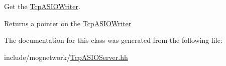 Get the \hyperlink{classmognetwork_1_1_tcp_a_s_i_o_writer}{Tcp\-A\-S\-I\-O\-Writer}. 

\begin{DoxyReturn}{Returns}
a pointer on the \hyperlink{classmognetwork_1_1_tcp_a_s_i_o_writer}{Tcp\-A\-S\-I\-O\-Writer} 
\end{DoxyReturn}


The documentation for this class was generated from the following file\-:\begin{DoxyCompactItemize}
\item 
include/mognetwork/\hyperlink{_tcp_a_s_i_o_server_8hh}{Tcp\-A\-S\-I\-O\-Server.\-hh}\end{DoxyCompactItemize}
